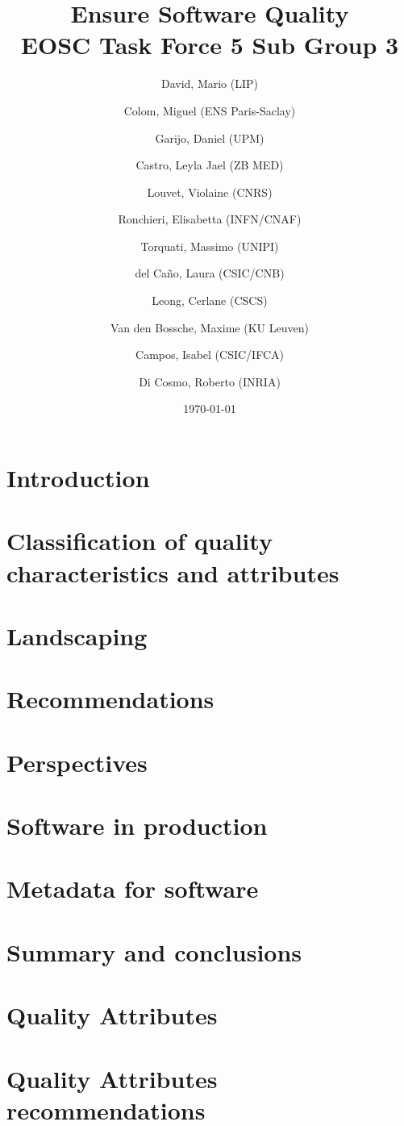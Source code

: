 \documentclass[a4paper]{article}
\title{Ensure Software Quality \\
    \large EOSC Task Force 5 Sub Group 3}
\author{
    David, Mario (LIP) \orcidlink{0000-0003-1802-5356} \and
    Colom, Miguel (ENS Paris-Saclay) \orcidlink{0000-0003-2636-0656} \and
    Garijo, Daniel (UPM) \orcidlink{0000-0003-0454-7145} \and
    Castro, Leyla Jael (ZB MED) \orcidlink{0000-0003-3986-0510} \and
    Louvet, Violaine (CNRS) \orcidlink{0000-0002-8742-8952} \and
    Ronchieri, Elisabetta (INFN/CNAF) \orcidlink{0000-0002-7341-6491} \and
    Torquati, Massimo (UNIPI) \orcidlink{0000-0001-6323-3459} \and
    del Ca\~{n}o, Laura (CSIC/CNB) \orcidlink{0000-0003-0981-2040} \and
    Leong, Cerlane (CSCS)  \orcidlink{0000-0001-8241-6277} \and
    Van den Bossche, Maxime (KU Leuven) \orcidlink{0000-0002-0938-0156} \and
    Campos, Isabel (CSIC/IFCA) \orcidlink{0000-0002-9350-0383} \and
    Di Cosmo, Roberto (INRIA) \orcidlink{0000-0002-7493-5349}
}
\date{\today}
\begin{document}
\maketitle

\tableofcontents

\newpage
\section{Introduction}
\label{sec:introduction}

\newpage

\section{Classification of quality characteristics and attributes}
\label{sec:classification}

\newpage

\section{Landscaping}
\label{sec:landscaping}

\newpage

\section{Recommendations}
\label{sec:recommendations}

\newpage

\section{Perspectives}
\label{sec:perspectives}

\newpage

\section{Software in production}
\label{sec:sw_in_prod}

\newpage

\section{Metadata for software}
\label{sec:metadata}

\newpage

\section{Summary and conclusions}
\label{sec:summary}

\newpage

\appendix
\section{Quality Attributes}
\label{appendix_qa}


\newpage
\section{Quality Attributes recommendations}
\label{appendix_recomm}


\newpage
\printbibliography
\end{document}
